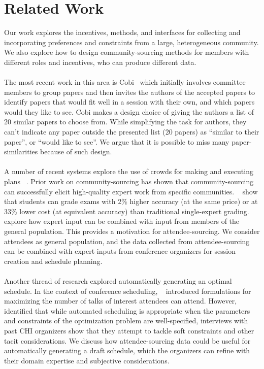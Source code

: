\documentclass[letterpaper]{article}
\begin{document}
\section{Related Work}
Our work explores the incentives, methods, and interfaces for collecting and incorporating preferences and constraints from a large, heterogeneous community. We also explore how to design community-sourcing methods for members with different roles and incentives, who can produce different data.
\\
\\
The most recent work in this area is Cobi~\cite{CobiUIST2013} which initially involves committee members to group papers and then invites the authors of the accepted papers to identify papers that would fit well in a session with their own, and which papers would they like to see. Cobi makes a design choice of giving the authors a list of 20 similar papers to choose from. While simplifying the task for authors, they can't indicate any paper outside the presented list (20 papers) as ``similar to their paper'', or ``would like to see''. We argue that it is possible to miss many paper-similarities because of such design.
\\
\\
A number of recent systems explore the use of crowds for making and executing plans ~\cite{CollaborativePlanning, Turkomatic, HCT, EmailVallet}. Prior work on community-sourcing has shown that community-sourcing can successfully elicit high-quality expert work from specific communities. ~\cite{CommunitySourcing} show that students can grade exams with 2\% higher accuracy (at the same price) or at 33\% lower cost (at equivalent accuracy) than traditional single-expert grading. ~\cite{CrowdDiversity} explore how expert input can be combined with input from members of the general population. This provides a motivation for attendee-sourcing. We consider attendees as general population, and the data collected from attendee-sourcing can be combined with expert inputs from conference organizers for session creation and schedule planning.
\\
\\
Another thread of research explored automatically generating an optimal schedule. In the context of conference scheduling, ~\cite{AutomaticScheduling} introduced formulations for maximizing the number of talks of interest attendees can attend. However, ~\cite{CobiUIST2013} identified that while automated scheduling is appropriate when the parameters and constraints of the optimization problem are well-specified, interviews with past CHI organizers show that they attempt to tackle soft constraints and other tacit considerations. We discuss how attendee-sourcing data could be useful for automatically generating  a draft schedule, which the organizers can refine with their domain expertise and subjective considerations.
\end{document}
